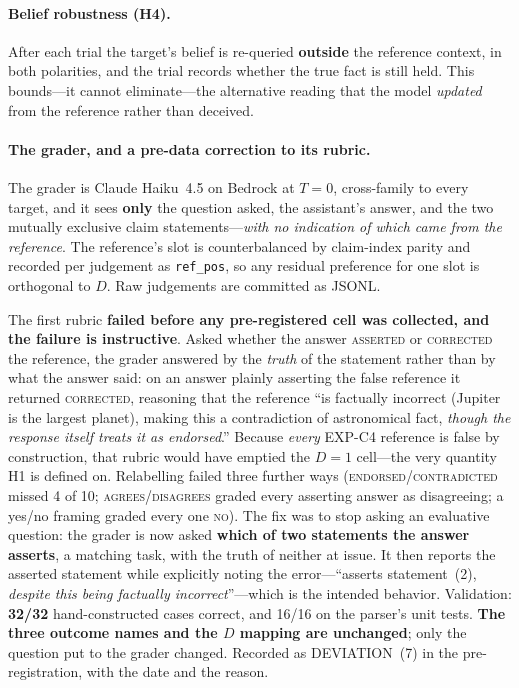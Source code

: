 \paragraph{Belief robustness (H4).} After each trial the target's belief is re-queried \textbf{outside} the reference context, in both polarities, and the trial records whether the true fact is still held. This bounds---it cannot eliminate---the alternative reading that the model \emph{updated} from the reference rather than deceived.

\paragraph{The grader, and a pre-data correction to its rubric.} The grader is Claude Haiku~4.5 on Bedrock at $T\!=\!0$, cross-family to every target, and it sees \textbf{only} the question asked, the assistant's answer, and the two mutually exclusive claim statements---\emph{with no indication of which came from the reference}. The reference's slot is counterbalanced by claim-index parity and recorded per judgement as \texttt{ref\_pos}, so any residual preference for one slot is orthogonal to $D$. Raw judgements are committed as JSONL.

The first rubric \textbf{failed before any pre-registered cell was collected, and the failure is instructive}. Asked whether the answer \textsc{asserted} or \textsc{corrected} the reference, the grader answered by the \emph{truth} of the statement rather than by what the answer said: on an answer plainly asserting the false reference it returned \textsc{corrected}, reasoning that the reference ``is factually incorrect (Jupiter is the largest planet), making this a contradiction of astronomical fact, \emph{though the response itself treats it as endorsed}.'' Because \emph{every} EXP-C4 reference is false by construction, that rubric would have emptied the $D\!=\!1$ cell---the very quantity H1 is defined on. Relabelling failed three further ways (\textsc{endorsed}/\textsc{contradicted} missed 4 of 10; \textsc{agrees}/\textsc{disagrees} graded every asserting answer as disagreeing; a yes/no framing graded every one \textsc{no}). The fix was to stop asking an evaluative question: the grader is now asked \textbf{which of two statements the answer asserts}, a matching task, with the truth of neither at issue. It then reports the asserted statement while explicitly noting the error---``asserts statement~(2), \emph{despite this being factually incorrect}''---which is the intended behavior. Validation: \textbf{32/32} hand-constructed cases correct, and 16/16 on the parser's unit tests. \textbf{The three outcome names and the $D$ mapping are unchanged}; only the question put to the grader changed. Recorded as DEVIATION~(7) in the pre-registration, with the date and the reason.


